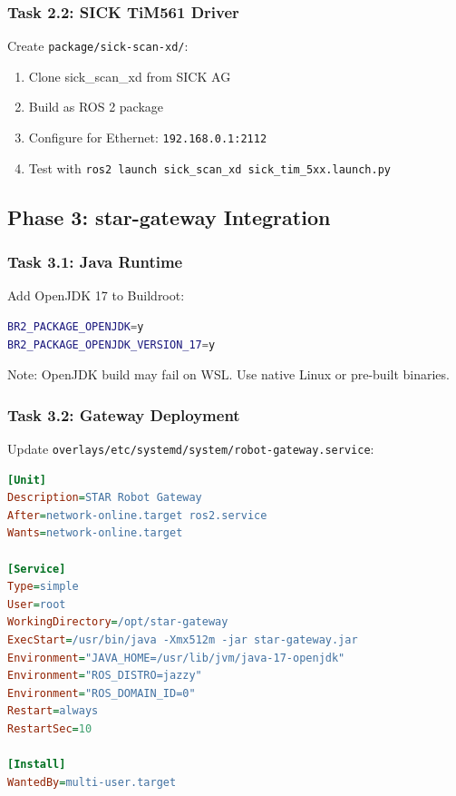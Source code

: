 \documentclass[11pt,letterpaper]{article}
\begin{document}
\subsubsection{Task 2.2: SICK TiM561 Driver}

Create \texttt{package/sick-scan-xd/}:

\begin{enumerate}
    \item Clone sick\_scan\_xd from SICK AG
    \item Build as ROS 2 package
    \item Configure for Ethernet: \texttt{192.168.0.1:2112}
    \item Test with \texttt{ros2 launch sick\_scan\_xd sick\_tim\_5xx.launch.py}
\end{enumerate}

\subsection{Phase 3: star-gateway Integration}

\subsubsection{Task 3.1: Java Runtime}

Add OpenJDK 17 to Buildroot:

\begin{lstlisting}[language=bash, caption=Add to rpi5\_64\_defconfig]
BR2_PACKAGE_OPENJDK=y
BR2_PACKAGE_OPENJDK_VERSION_17=y
\end{lstlisting}

Note: OpenJDK build may fail on WSL. Use native Linux or pre-built binaries.

\subsubsection{Task 3.2: Gateway Deployment}

Update \texttt{overlays/etc/systemd/system/robot-gateway.service}:

\begin{lstlisting}[language=ini, caption=robot-gateway.service]
[Unit]
Description=STAR Robot Gateway
After=network-online.target ros2.service
Wants=network-online.target

[Service]
Type=simple
User=root
WorkingDirectory=/opt/star-gateway
ExecStart=/usr/bin/java -Xmx512m -jar star-gateway.jar
Environment="JAVA_HOME=/usr/lib/jvm/java-17-openjdk"
Environment="ROS_DISTRO=jazzy"
Environment="ROS_DOMAIN_ID=0"
Restart=always
RestartSec=10

[Install]
WantedBy=multi-user.target
\end{lstlisting}
\end{document}
